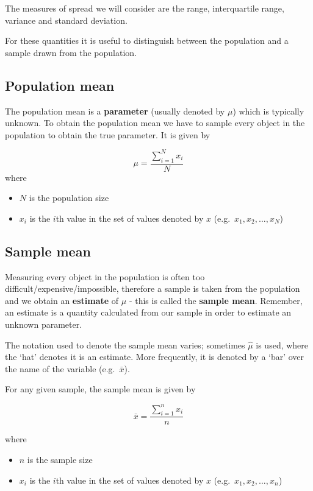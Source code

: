\documentclass[
  oneside]{krantz}
\begin{document}
The measures of spread we will consider are the range, interquartile range, variance and standard deviation.

For these quantities it is useful to distinguish between the population and a sample drawn from the population.

\hypertarget{population-mean}{%
\subsection{Population mean}\label{population-mean}}

The population mean is a \textbf{parameter} (usually denoted by \(\mu\)) which is typically unknown. To obtain the population mean we have to sample every object in the population to obtain the true parameter. It is given by

\[\mu=\frac{\sum_{i=1}^{N} x_i}{N}\]
where

\begin{itemize}
\item
  \(N\) is the population size
\item
  \(x_i\) is the \(i\)th value in the set of values denoted by \(x\) (e.g.~\(x_1, x_2, \ldots ,x_N\))
\end{itemize}

\hypertarget{sample-mean}{%
\subsection{Sample mean}\label{sample-mean}}

Measuring every object in the population is often too difficult/expensive/impossible, therefore a sample is taken from the population and we obtain an \textbf{estimate} of \(\mu\) - this is called the \textbf{sample mean}. Remember, an estimate is a quantity calculated from our sample in order to estimate an unknown parameter.

The notation used to denote the sample mean varies; sometimes \(\hat{\mu}\) is used, where the `hat' denotes it is an estimate. More frequently, it is denoted by a `bar' over the name of the variable (e.g.~\(\bar x\)).

For any given sample, the sample mean is given by

\[\bar x = \frac{\sum_{i=1}^{n} x_i}{n}\]

where

\begin{itemize}
\item
  \(n\) is the sample size
\item
  \(x_i\) is the \(i\)th value in the set of values denoted by \(x\) (e.g.~\(x_1, x_2, \ldots ,x_n\))
\end{itemize}
\end{document}
